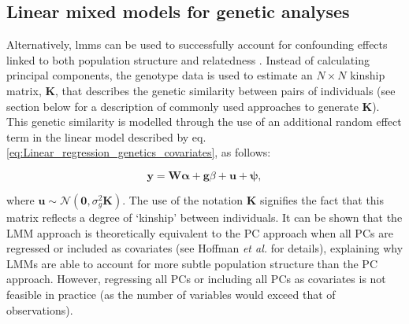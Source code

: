 \subsection{Linear mixed models for genetic analyses}
\label{sec:LMM}

Alternatively, \gls{lmm}s can be used to successfully account for confounding effects linked to both population structure and relatedness 
\cite{yu2006unified, kang2008efficient,kang2010variance, price2010new, zhou2012genome, lee2018genome}.
Instead of calculating principal components, the genotype data is used to estimate an $N \times N$ kinship matrix, $\mathbf{K}$, that describes the genetic similarity between pairs of individuals (see section below for a description of commonly used approaches to generate $\mathbf{K}$). 
This genetic similarity is modelled through the use of an additional random
effect term in the linear model described by eq. \eqref{eq:Linear_regression_genetics_covariates}, as follows:

\begin{equation}\label{eq:Linear_mixed_model}
 \mathbf{y} =  \mathbf{W}\boldsymbol{\alpha} + \mathbf{g}\beta + \mathbf{u} + \boldsymbol{\psi}, 
\end{equation}

where $\mathbf{u} \sim \mathcal{N}(\mathbf{0}, \sigma_g^2\mathbf{K})$.
The use of the notation $\mathbf{K}$ signifies the fact that this matrix reflects a degree of `kinship' between individuals. 
It can be shown that the LMM approach is theoretically equivalent to the PC
approach when all PCs are regressed or included as covariates (see Hoffman \textit{et al.} \cite{hoffman2013correcting} for details), explaining why LMMs are able to account for more subtle population structure than the PC approach. 
However, regressing all PCs or including all PCs as covariates is not feasible in practice (as the number of variables would exceed that of observations).




